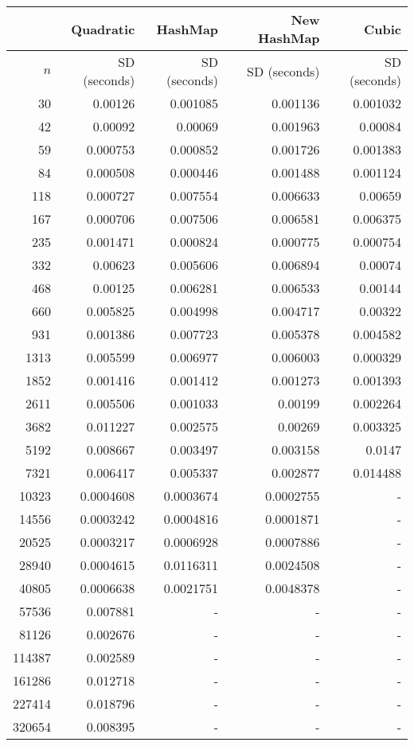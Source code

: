 \begin{tabular}{rrrrr}
    &Quadratic & HashMap & New HashMap & Cubic\\\hline
    $n$ & SD (seconds) & SD (seconds) & SD (seconds) & SD (seconds) \\\hline
    30&0.00126&0.001085&0.001136&0.001032\\
    42&0.00092&0.00069&0.001963&0.00084\\
    59&0.000753&0.000852&0.001726&0.001383\\
    84&0.000508&0.000446&0.001488&0.001124\\
    118&0.000727&0.007554&0.006633&0.00659\\
    167&0.000706&0.007506&0.006581&0.006375\\
    235&0.001471&0.000824&0.000775&0.000754\\
    332&0.00623&0.005606&0.006894&0.00074\\
    468&0.00125&0.006281&0.006533&0.00144\\
    660&0.005825&0.004998&0.004717&0.00322\\
    931&0.001386&0.007723&0.005378&0.004582\\
    1313&0.005599&0.006977&0.006003&0.000329\\
    1852&0.001416&0.001412&0.001273&0.001393\\
    2611&0.005506&0.001033&0.00199&0.002264\\
    3682&0.011227&0.002575&0.00269&0.003325\\
    5192&0.008667&0.003497&0.003158&0.0147\\
    7321&0.006417&0.005337&0.002877&0.014488\\
    10323&0.0004608&0.0003674&0.0002755&-\\
    14556&0.0003242&0.0004816&0.0001871&-\\
    20525&0.0003217&0.0006928&0.0007886&-\\
    28940&0.0004615&0.0116311&0.0024508&-\\
    40805&0.0006638&0.0021751&0.0048378&-\\
    57536&0.007881&-&-&-\\
    81126&0.002676&-&-&-\\
    114387&0.002589&-&-&-\\
    161286&0.012718&-&-&-\\
    227414&0.018796&-&-&-\\
    320654&0.008395&-&-&-\\
\end{tabular}
    